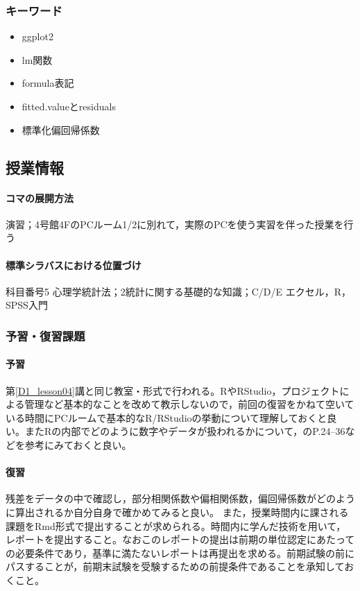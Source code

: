 \subsubsection{キーワード}
\begin{itemize}
\item ggplot2
\item lm関数
\item formula表記
\item fitted.valueとresiduals
\item 標準化偏回帰係数
\end{itemize}
\subsection{授業情報}
\paragraph{コマの展開方法}
演習；4号館4FのPCルーム1/2に別れて，実際のPCを使う実習を伴った授業を行う
\paragraph{標準シラバスにおける位置づけ}
科目番号5 心理学統計法；2統計に関する基礎的な知識；C/D/E エクセル，R，SPSS入門
\subsubsection{予習・復習課題}
\paragraph{予習}
第\ref{D1_lesson04}講と同じ教室・形式で行われる。RやRStudio，プロジェクトによる管理など基本的なことを改めて教示しないので，前回の復習をかねて空いている時間にPCルームで基本的なR/RStudioの挙動について理解しておくと良い。またRの内部でどのように数字やデータが扱われるかについて，\citet{kosugi2019}のP.24--36などを参考にみておくと良い。
\paragraph{復習}
残差をデータの中で確認し，部分相関係数や偏相関係数，偏回帰係数がどのように算出されるか自分自身で確かめてみると良い。
また，授業時間内に課される課題をRmd形式で提出することが求められる。時間内に学んだ技術を用いて，レポートを提出すること。なおこのレポートの提出は前期の単位認定にあたっての必要条件であり，基準に満たないレポートは再提出を求める。前期試験の前にパスすることが，前期末試験を受験するための前提条件であることを承知しておくこと。

